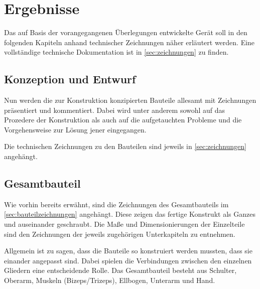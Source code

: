 \chapter{Ergebnisse}
	Das auf Basis der vorangegangenen Überlegungen entwickelte Gerät soll in den folgenden Kapiteln anhand technischer Zeichnungen näher erläutert werden.
	Eine vollständige technische Dokumentation ist in \cref{sec:zeichnungen} zu finden.
	\section{Konzeption und Entwurf}
		Nun werden die zur Konstruktion konzipierten Bauteile allesamt mit Zeichnungen präsentiert und kommentiert.
		Dabei wird unter anderem sowohl auf das Prozedere der Konstruktion als auch auf die aufgetauchten Probleme und die Vorgehensweise zur Lösung jener eingegangen.\par
		Die technischen Zeichnungen zu den Bauteilen sind jeweils in \cref{sec:zeichnungen} angehängt.
		
	\section{Gesamtbauteil}
		Wie vorhin bereits erwähnt, sind die Zeichnungen des Gesamtbauteils im \cref{sec:bauteilzeichnungen} angehängt.
		Diese zeigen das fertige Konstrukt als Ganzes und auseinander geschraubt.
		Die Maße und Dimensionierungen der Einzelteile sind den Zeichnungen der jeweils zugehörigen Unterkapiteln zu entnehmen.\par
		Allgemein ist zu sagen, dass die Bauteile so konstruiert werden mussten, dass sie einander angepasst sind.
		Dabei spielen die Verbindungen zwischen den einzelnen Gliedern eine entscheidende Rolle.
		Das Gesamtbauteil besteht aus Schulter, Oberarm, Muskeln (Bizeps/Trizeps), Ellbogen, Unterarm und Hand.
	
